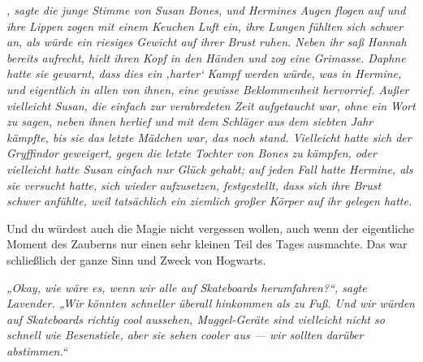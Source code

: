 \emph{, sagte die junge Stimme von Susan Bones, und Hermines Augen flogen auf und ihre Lippen zogen mit einem Keuchen Luft ein, ihre Lungen fühlten sich schwer an, als würde ein riesiges Gewicht auf ihrer Brust ruhen. Neben ihr saß Hannah bereits aufrecht, hielt ihren Kopf in den Händen und zog eine Grimasse. Daphne hatte sie gewarnt, dass dies ein ‚harter‘ Kampf werden würde, was in Hermine, und eigentlich in allen von ihnen, eine gewisse Beklommenheit hervorrief. Außer vielleicht Susan, die einfach zur verabredeten Zeit aufgetaucht war, ohne ein Wort zu sagen, neben ihnen herlief und mit dem Schläger aus dem siebten Jahr kämpfte, bis sie das letzte Mädchen war, das noch stand. Vielleicht hatte sich der Gryffindor geweigert, gegen die letzte Tochter von Bones zu kämpfen, oder vielleicht hatte Susan einfach nur Glück gehabt; auf jeden Fall hatte Hermine, als sie versucht hatte, sich wieder aufzusetzen, festgestellt, dass sich ihre Brust schwer anfühlte, weil tatsächlich ein ziemlich großer Körper auf ihr gelegen hatte.}

Und du würdest auch die Magie nicht vergessen wollen, auch wenn der eigentliche Moment des Zauberns nur einen sehr kleinen Teil des Tages ausmachte. Das war schließlich der ganze Sinn und Zweck von Hogwarts.

\emph{„Okay, wie wäre es, wenn wir alle auf Skateboards herumfahren?“, sagte Lavender.
„Wir könnten schneller überall hinkommen als zu Fuß. Und wir würden auf Skateboards richtig cool aussehen, Muggel-Geräte sind vielleicht nicht so schnell wie Besenstiele, aber sie sehen cooler aus — wir sollten darüber abstimmen.“}

